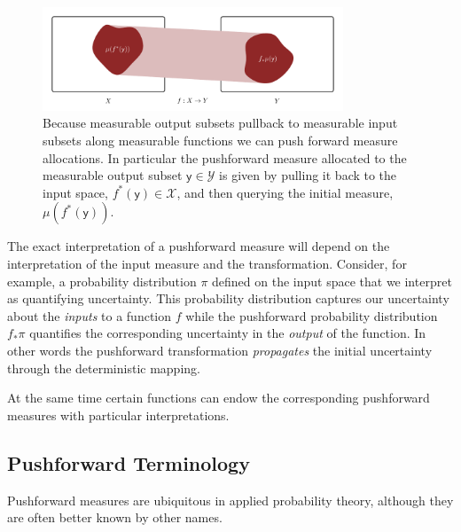 \documentclass[
  letterpaper,
  DIV=11,
  numbers=noendperiod]{scrartcl}
\begin{document}
\begin{figure}

{\centering \includegraphics[width=0.8\textwidth,height=\textheight]{figures/pushforward_measure/pushforward_measure.pdf}

}

\caption{\label{fig-pushforward-measure}Because measurable output
subsets pullback to measurable input subsets along measurable functions
we can push forward measure allocations. In particular the pushforward
measure allocated to the measurable output subset
\(\mathsf{y} \in \mathcal{Y}\) is given by pulling it back to the input
space, \(f^{*}(\mathsf{y}) \in \mathcal{X}\), and then querying the
initial measure, \(\mu(f^{*}(\mathsf{y}))\).}

\end{figure}

The exact interpretation of a pushforward measure will depend on the
interpretation of the input measure and the transformation. Consider,
for example, a probability distribution \(\pi\) defined on the input
space that we interpret as quantifying uncertainty. This probability
distribution captures our uncertainty about the \emph{inputs} to a
function \(f\) while the pushforward probability distribution
\(f_{*} \pi\) quantifies the corresponding uncertainty in the
\emph{output} of the function. In other words the pushforward
transformation \emph{propagates} the initial uncertainty through the
deterministic mapping.

At the same time certain functions can endow the corresponding
pushforward measures with particular interpretations.

\hypertarget{sec:terminology}{%
\subsection{Pushforward Terminology}\label{sec:terminology}}

Pushforward measures are ubiquitous in applied probability theory,
although they are often better known by other names.
\end{document}

